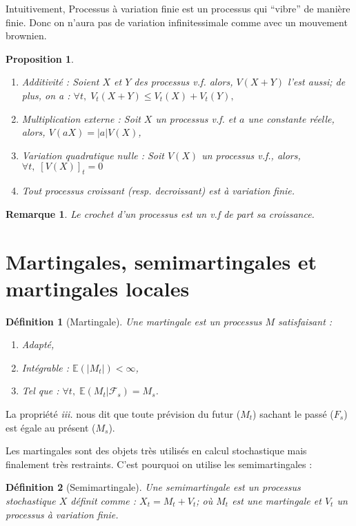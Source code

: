 \documentclass[openany]{book}
\newcommand{\F}{\mathscr{F}}
\newcommand{\E}{\mathbb{E}}
\theoremstyle{thmfont}
\theoremstyle{deffont}
\newtheorem{definition}[definition]{Définition}
\theoremstyle{thmfont}
\newtheorem{prop}[prop]{Proposition}
\theoremstyle{deffont}
\newtheorem*{remark}{Remarque}
\begin{document}
Intuitivement, Processus à variation finie est un processus qui ``vibre'' de manière finie. Donc on n'aura pas de variation infinitessimale comme avec un mouvement brownien.

\begin{prop}
  \begin{enumerate}[nosep]
  \item Additivité : Soient $X$ et $Y$ des processus v.f. alors, $V(X+Y)$ l'est aussi; de plus, on a : $\forall t, \; V_t(X+Y) \leq V_t(X)+V_t(Y),$
  \item Multiplication externe : Soit $X$ un processus v.f. et $a$ une constante réelle, alors, $V(aX) = |a| V(X)$,
  \item Variation quadratique nulle : Soit $V(X)$ un processus v.f., alors,\\ $\forall t,\; [V(X)]_t=0$
  \item Tout processus croissant (resp. decroissant) est à variation finie.
  \end{enumerate}
\end{prop}

\begin{remark}
  Le crochet d'un processus est un v.f de part sa croissance.
\end{remark}

\section{Martingales, semimartingales et martingales locales}

\begin{definition}[Martingale]
  Une \textit{martingale} est un processus $M$ satisfaisant :
  \begin{enumerate}[nosep]
    \item Adapté,
    \item Intégrable : $\E(|M_t|) < \infty$,
    \item Tel que : $\forall t, \; \E(M_t|\F_s) = M_s$.
  \end{enumerate}
\end{definition}

La propriété \textit{iii.} nous dit que toute prévision du futur ($M_t$) sachant le passé ($F_s$) est égale au présent ($M_s$).

Les martingales sont des objets très utilisés en calcul stochastique mais finalement très restraints. C'est pourquoi on utilise les semimartingales :

\begin{definition}[Semimartingale] Une \textit{semimartingale} est un processus stochastique $X$ définit comme : $X_t = M_t + V_t$; où $M_t$ est une martingale et $V_t$ un processus à variation finie.
\end{definition}
\end{document}

